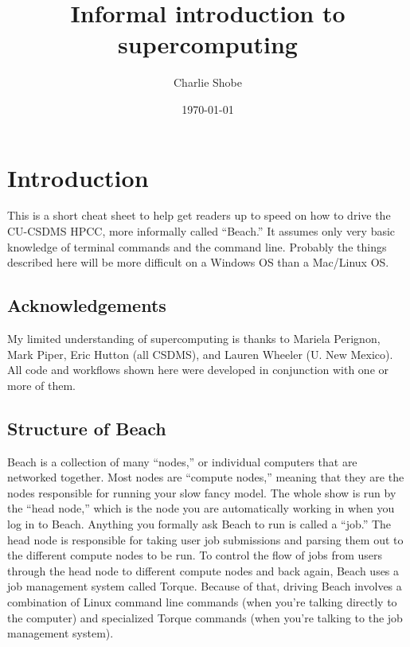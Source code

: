 \documentclass[12pt, oneside]{article}   	%
\title{Informal introduction to supercomputing}
\author{Charlie Shobe}
\date{\today}							%
\begin{document}
\maketitle

\tableofcontents


\section{Introduction}
This is a short cheat sheet to help get readers up to speed on how to drive the CU-CSDMS HPCC, more informally called ``Beach.'' It assumes only very basic knowledge of terminal commands and the command line. Probably the things described here will be more difficult on a Windows OS than a Mac/Linux OS.
\subsection{Acknowledgements}
My limited understanding of supercomputing is thanks to Mariela Perignon, Mark Piper, Eric Hutton (all CSDMS), and Lauren Wheeler (U. New Mexico). All code and workflows shown here were developed in conjunction with one or more of them.
\subsection{Structure of Beach}
Beach is a collection of many ``nodes,'' or individual computers that are networked together. Most nodes are ``compute nodes,'' meaning that they are the nodes responsible for running your slow fancy model. The whole show is run by the ``head node,'' which is the node you are automatically working in when you log in to Beach. Anything you formally ask Beach to run is called a ``job.'' The head node is responsible for taking user job submissions and parsing them out to the different compute nodes to be run. To control the flow of jobs from users through the head node to different compute nodes and back again, Beach uses a job management system called Torque. Because of that, driving Beach involves a combination of Linux command line commands (when you're talking directly to the computer) and specialized Torque commands (when you're talking to the job management system).
\end{document}
